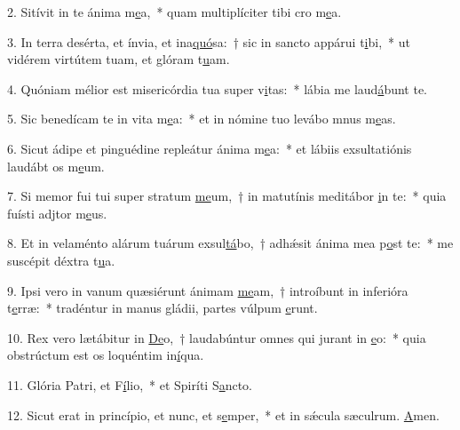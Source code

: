 2. Sitívit in te ánima m\uline{e}a,~* quam multiplíciter tibi cro m\uline{e}a.\par 
3. In terra desérta, et ínvia, et ina\uline{quó}sa:~† sic in sancto appárui t\uline{i}bi,~* ut vidérem virtútem tuam, et glóram t\uline{u}am.\par 
4. Quóniam mélior est misericórdia tua super v\uline{i}tas:~* lábia me laud\uline{á}bunt te.\par 
5. Sic benedícam te in vita m\uline{e}a:~* et in nómine tuo levábo mnus m\uline{e}as.\par 
6. Sicut ádipe et pinguédine repleátur ánima m\uline{e}a:~* et lábiis exsultatiónis laudábt os m\uline{e}um.\par 
7. Si memor fui tui super stratum \uline{me}um,~† in matutínis meditábor \uline{i}n te:~* quia fuísti adjtor m\uline{e}us.\par 
8. Et in velaménto alárum tuárum exsul\uline{tá}bo,~† adhǽsit ánima mea p\uline{o}st te:~* me suscépit déxtra t\uline{u}a.\par 
9. Ipsi vero in vanum quæsiérunt ánimam \uline{me}am,~† introíbunt in inferióra t\uline{e}rræ:~* tradéntur in manus gládii, partes vúlpum \uline{e}runt.\par 
10. Rex vero lætábitur in \uline{De}o,~† laudabúntur omnes qui jurant in \uline{e}o:~* quia obstrúctum est os loquéntim in\uline{í}qua.\par 
11. Glória Patri, et F\uline{í}lio,~* et Spiríti S\uline{a}ncto.\par 
12. Sicut erat in princípio, et nunc, et s\uline{e}mper,~* et in sǽcula sæculrum. \uline{A}men.\par 

